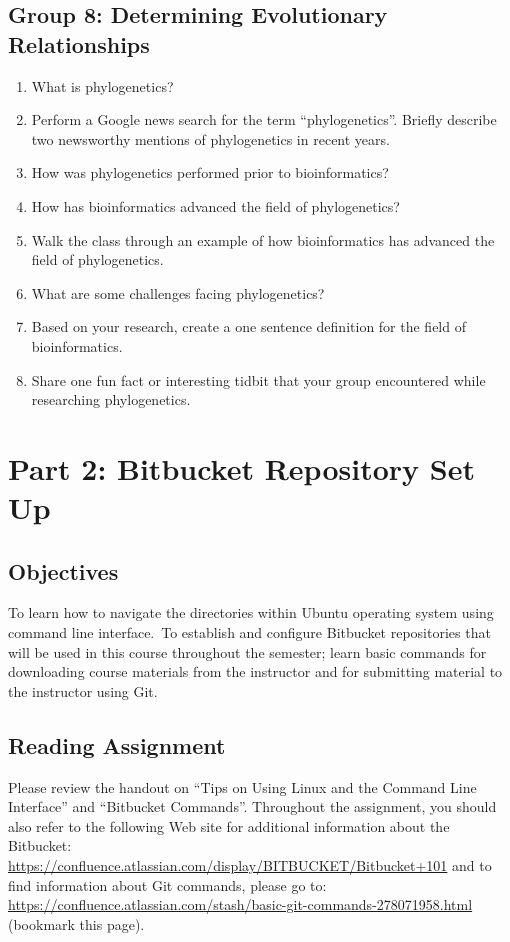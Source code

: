 \subsection*{Group 8: Determining Evolutionary Relationships}
\begin{enumerate}
	\item What is phylogenetics?
	\item Perform a Google news search for the term ``phylogenetics''.  Briefly describe two newsworthy mentions of phylogenetics in recent years.
	\item How was phylogenetics performed prior to bioinformatics?
	\item How has bioinformatics advanced the field of phylogenetics?
	\item Walk the class through an example of how bioinformatics has advanced the field of phylogenetics.
	\item What are some challenges facing phylogenetics?
	\item Based on your research, create a one sentence definition for the field of bioinformatics.
	\item Share one fun fact or interesting tidbit that your group encountered while researching phylogenetics.
\end{enumerate}









\section*{Part 2: Bitbucket Repository Set Up}

\subsection*{Objectives}
\vspace*{-.1in}
To learn how to navigate the directories within Ubuntu operating system using command line interface.~To establish and configure Bitbucket repositories that will be used in this course throughout the semester; learn basic commands for downloading course materials from the instructor and for submitting material to the instructor using Git.

\vspace*{-.2in}
\subsection*{Reading Assignment}
\vspace*{-.1in}
Please review the handout on ``Tips on Using Linux and the Command Line Interface'' and ``Bitbucket Commands''. Throughout the assignment, you should also refer to the following Web site for additional information about the Bitbucket: \url{https://confluence.atlassian.com/display/BITBUCKET/Bitbucket+101} and to find information about Git commands, please go to: \url{https://confluence.atlassian.com/stash/basic-git-commands-278071958.html} (bookmark this page).

